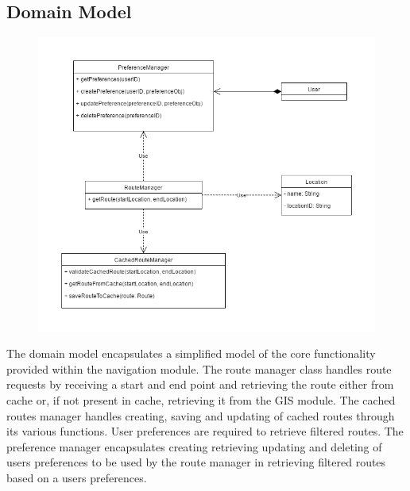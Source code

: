 \documentclass[12pt]{article}
\begin{document}
\subsection{Domain Model}
\begin{figure}
\centering
\includegraphics[scale=0.5]{diagrams/navigationDomainModel.png}
\end{figure}
The domain model encapsulates a simplified model of the core functionality provided within the navigation module. The route manager class handles route requests by receiving a start and end point and retrieving the route either from cache or, if not present in cache, retrieving it from the GIS module. 
The cached routes manager handles creating, saving and updating of cached routes through its various functions.
User preferences are required to retrieve filtered routes. The preference manager encapsulates creating retrieving updating and deleting of users preferences to be used by the route manager in retrieving filtered routes based on a users preferences.
\end{document}
